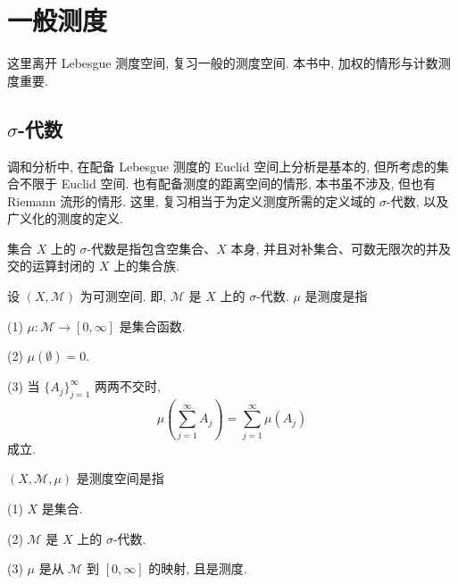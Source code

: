 
\section{一般测度}\label{sec:2.2}













这里离开 Lebesgue 测度空间, 复习一般的测度空间. 本书中, 加权的情形与计数测度重要.

\subsection*{$\sigma$-代数}

调和分析中, 在配备 Lebesgue 测度的 Euclid 空间上分析是基本的, 但所考虑的集合不限于 Euclid 空间. 也有配备测度的距离空间的情形, 本书虽不涉及, 但也有 Riemann 流形的情形. 这里, 复习相当于为定义测度所需的定义域的 $\sigma$-代数, 以及广义化的测度的定义.

\begin{definition}[$\sigma$-代数]\label{def:2.10}
集合 $X$ 上的 $\sigma$-代数是指包含空集合、$X$ 本身, 并且对补集合、可数无限次的并及交的运算封闭的 $X$ 上的集合族.
\end{definition}

\begin{definition}[测度]\label{def:2.11}
设 $(X, \mathcal{M})$ 为可测空间. 即, $\mathcal{M}$ 是 $X$ 上的 $\sigma$-代数. $\mu$ 是测度是指

(1) $\mu: \mathcal{M} \to [0, \infty]$ 是集合函数.

(2) $\mu(\emptyset) = 0$.

(3) 当 $\{A_{j}\}_{j=1}^{\infty}$ 两两不交时,
\[
\mu\left(\sum_{j=1}^{\infty}A_{j}\right) = \sum_{j=1}^{\infty}\mu(A_{j})
\]
成立.
\end{definition}

\begin{definition}\label{def:2.12}
$(X, \mathcal{M}, \mu)$ 是测度空间是指

(1) $X$ 是集合.

(2) $\mathcal{M}$ 是 $X$ 上的 $\sigma$-代数.

(3) $\mu$ 是从 $\mathcal{M}$ 到 $[0, \infty]$ 的映射, 且是测度.
\end{definition}


